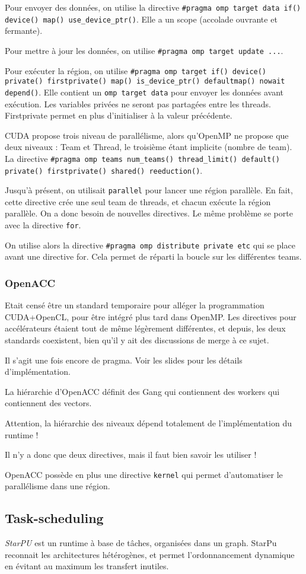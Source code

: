 \documentclass{article}
\begin{document}
Pour envoyer des données, on utilise la directive \texttt{\#pragma omp target data if() device() map() use\_device\_ptr()}. Elle a un scope (accolade ouvrante et fermante).

Pour mettre à jour les données, on utilise \texttt{\#pragma omp target update ...}.

Pour exécuter la région, on utilise \texttt{\#pragma omp target if() device() private() firstprivate() map() is\_device\_ptr() defaultmap() nowait depend()}. Elle contient un \texttt{omp target data} pour envoyer les données avant exécution. Les variables privées ne seront pas partagées entre les threads. Firstprivate permet en plus d'initialiser à la valeur précédente.
\bigskip

CUDA propose trois niveau de parallélisme, alors qu'OpenMP ne propose que deux niveaux : Team et Thread, le troisième étant implicite (nombre de team). La directive \texttt{\#pragma omp teams num\_teams() thread\_limit() default() private() firstprivate() shared() reeduction()}. 

Jusqu'à présent, on utilisait \texttt{parallel} pour lancer une région parallèle. En fait, cette directive crée une seul team de threads, et chacun exécute la région parallèle. On a donc besoin de nouvelles directives. Le même problème se porte avec la directive \texttt{for}.

On utilise alors la directive \texttt{\#pragma omp distribute private etc} qui se place avant une directive for. Cela permet de réparti la boucle sur les différentes teams.


\subsubsection{OpenACC}
Etait censé être un standard temporaire pour alléger la programmation CUDA+OpenCL, pour être intégré plus tard dans OpenMP. Les directives pour accélérateurs étaient tout de même légèrement différentes, et depuis, les deux standards coexistent, bien qu'il y ait des discussions de merge à ce sujet.

Il s'agit une fois encore de pragma. Voir les slides pour les détails d'implémentation.

La hiérarchie d'OpenACC définit des Gang qui contiennent des workers qui contiennent des vectors. 

Attention, la hiérarchie des niveaux dépend totalement de l'implémentation du runtime !

Il n'y a donc que deux directives, mais il faut bien savoir les utiliser !

OpenACC possède en plus une directive \texttt{kernel} qui permet d'automatiser le parallélisme dans une région.


\subsection{Task-scheduling}
\emph{StarPU} est un runtime à base de tâches, organisées dans un graph. StarPu reconnait les architectures hétérogènes, et permet l'ordonnancement dynamique en évitant au maximum les transfert inutiles.
\end{document}
